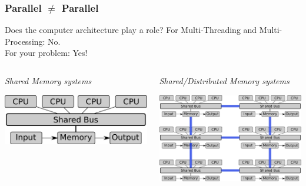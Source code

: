 \documentclass[9pt,pdftex]{beamer}
\begin{document}
\begin{frame}
  \frametitle{Parallel $\neq$ Parallel}
  \begin{block}{Does the computer architecture play a role?}
    For Multi-Threading and Multi-Processing: No.\\
    For your problem: Yes!
  \end{block}
  
  \begin{columns}[t]
  \begin{column}{.45\textwidth}
    \begin{center}
      \emph{Shared Memory systems}\\[24pt]
    \end{center}
    \includegraphics[width=.9\textwidth]{img/MultipleVonNeumann}\\
  \end{column}
\hfill
  \begin{column}{.45\textwidth}
    \begin{center}
      \emph{Shared/Distributed Memory systems}\\[24pt]
    \end{center}
    \includegraphics[width=.9\textwidth]{img/BatchVonNeumann} \\
      \end{column}
\end{columns}
\end{frame}
\end{document}
